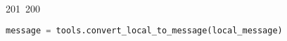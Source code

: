201~200~\documentclass{article}
\begin{document}
\begin{lstlisting}[language=Python, caption=Unlock messages]
	                                                                                                                                                                                                                                                                                                	                                                                                                                                        	    	                                                                                                	                                                                                                                                                                                                                    message = tools.convert_local_to_message(local_message)
	                                                                                                                                                                                                                                                                                                	                                                                                                                                        	    	                                                                                                	                                                                                                                                                                                                                                receive_message_from_user(user, message)
	                                                                                                                                                                                                                                                                                                	                                                                                                                                        	    	                                                                                                	                                                                                                                                                                                                                                \end{lstlisting}

	                                                                                                                                                                                                                                                                                                	                                                                                                                                        	    	                                                                                                	                                                                                                                                                                                                                                \clearpage
\end{document}
